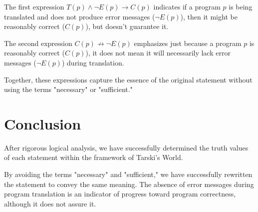 \documentclass[12pt]{article}
\begin{document}
The first expression \( T(p) \land \lnot E(p) \rightarrow C(p) \) indicates if a program \( p \) is being translated and does not produce error messages (\( \lnot E(p) \)), then it might be reasonably correct (\( C(p) \)), but doesn't guarantee it.

The second expression \( C(p) \nrightarrow \lnot E(p) \) emphasizes just because a program \( p \) is reasonably correct (\( C(p) \)), it does not mean it will necessarily lack error messages (\( \lnot E(p) \)) during translation.

Together, these expressions capture the essence of the original statement without using the terms "necessary" or "sufficient."

\section{Conclusion}
After rigorous logical analysis, we have successfully determined the truth values of each statement within the framework of Tarski's World.

By avoiding the terms "necessary" and "sufficient," we have successfully rewritten the statement to convey the same meaning. The absence of error messages during program translation is an indicator of progress toward program correctness, although it does not assure it.
\end{document}
